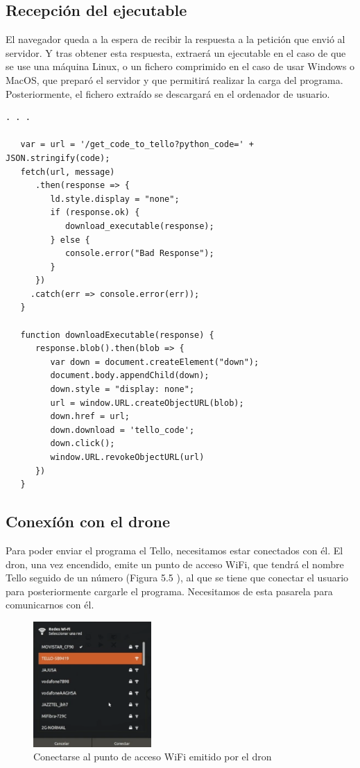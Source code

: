 \documentclass{report}
\begin{document}
\subsection{Recepción del ejecutable}

El navegador queda a la espera de recibir la respuesta a la petición que envió al servidor. Y tras obtener esta respuesta, extraerá un ejecutable en el caso de que se use una máquina Linux, o un fichero comprimido en el caso de usar Windows o MacOS, que preparó el servidor y que permitirá realizar la carga del programa.  Posteriormente, el fichero extraído se descargará en el ordenador de usuario.
\\
\begin{lstlisting}[frame=single,breaklines=true, label=Extracción empaquetado y descarga, caption=Extracción empaquetado y descarga,  captionpos=b]
   . . .
   
   var = url = '/get_code_to_tello?python_code=' + JSON.stringify(code);
   fetch(url, message)
      .then(response => {
         ld.style.display = "none";
         if (response.ok) {
            download_executable(response);
         } else {
            console.error("Bad Response");
         }
      })
     .catch(err => console.error(err));
   }
   
   function downloadExecutable(response) {
      response.blob().then(blob => {
         var down = document.createElement("down");
         document.body.appendChild(down);
         down.style = "display: none";
         url = window.URL.createObjectURL(blob);
         down.href = url;
         down.download = 'tello_code';
         down.click();
         window.URL.revokeObjectURL(url)
      })
   }
\end{lstlisting}

\subsection{Conexíón con el drone}

Para poder enviar el programa el Tello, necesitamos estar conectados con él. El dron, una vez encendido, emite un punto de acceso WiFi, que tendrá el nombre Tello seguido de un número (Figura 5.5 ), al que se tiene que conectar el usuario para posteriormente cargarle el programa. Necesitamos de esta pasarela para comunicarnos con él.
\\
\begin{figure}[h!]
	\centering
    	\includegraphics[width=0.4\textwidth]{images/seleccionar_wifi_tello.png}
  	\caption{Conectarse al punto de acceso WiFi emitido por el dron}
  	\label{Conectarse al punto de acceso WiFi emitido por el dron}
\end{figure}
\end{document}
